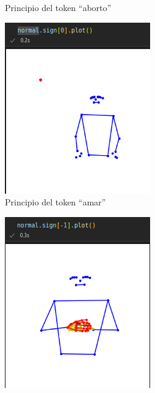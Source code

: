 \begin{figure}[t]
\begin{subfigure}[t]{0.3\textwidth}
		\caption{Principio del token ``aborto''}
		\label{f:principio_variable_aborto}
	\end{subfigure}
		\begin{subfigure}[t]{0.3\textwidth}
		\centering
		\includegraphics[align=t,width=0.9\linewidth, height =0.9\linewidth]{Graphics/principio_amar.png}
		\caption{Principio del token ``amar''}
		\label{f:principio_variable_amar}
	\end{subfigure}	
	\vskip 0pt
	\begin{subfigure}[t]{0.3\textwidth}
		\centering
		\includegraphics[align=t,width=0.9\linewidth, height =0.9\linewidth]{Graphics/final_abandonar.png}

\end{subfigure}
\end{figure}

